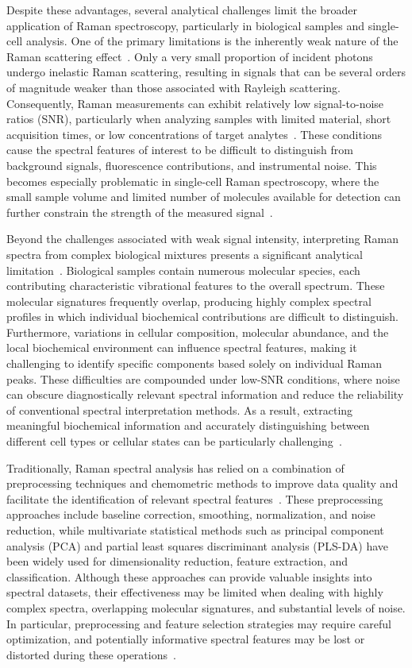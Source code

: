 \documentclass[journal,onecolumn]{IEEEtran}
\begin{document}
Despite these advantages, several analytical challenges limit the broader
application of Raman spectroscopy, particularly in biological samples and
single-cell analysis. One of the primary limitations is the inherently weak
nature of the Raman scattering effect~\cite{yi2025surface}. Only a very small
proportion of incident photons undergo inelastic Raman scattering, resulting
in signals that can be several orders of magnitude weaker than those associated
with Rayleigh scattering. Consequently, Raman measurements can exhibit
relatively low signal-to-noise ratios (SNR), particularly when analyzing
samples with limited material, short acquisition times, or low concentrations
of target analytes~\cite{yi2025surface}. These conditions cause the spectral
features of interest to be difficult to distinguish from background signals,
fluorescence contributions, and instrumental noise. This becomes especially
problematic in single-cell Raman spectroscopy, where the small sample volume
and limited number of molecules available for detection can further constrain
the strength of the measured signal~\cite{zhang2024genotype}.

Beyond the challenges associated with weak signal intensity, interpreting
Raman spectra from complex biological mixtures presents a significant
analytical limitation~\cite{yi2025surface}. Biological samples contain
numerous molecular species, each contributing characteristic vibrational
features to the overall spectrum. These molecular signatures frequently
overlap, producing highly complex spectral profiles in which individual
biochemical contributions are difficult to distinguish. Furthermore,
variations in cellular composition, molecular abundance, and the local
biochemical environment can influence spectral features, making it
challenging to identify specific components based solely on individual Raman
peaks. These difficulties are compounded under low-SNR conditions, where noise
can obscure diagnostically relevant spectral information and reduce the
reliability of conventional spectral interpretation methods. As a result,
extracting meaningful biochemical information and accurately distinguishing
between different cell types or cellular states can be particularly
challenging~\cite{zhang2024genotype}.

Traditionally, Raman spectral analysis has relied on a combination of
preprocessing techniques and chemometric methods to improve data quality and
facilitate the identification of relevant spectral
features~\cite{lussier2020deep,pan2021review}. These preprocessing approaches include baseline
correction, smoothing, normalization, and noise reduction, while multivariate
statistical methods such as principal component analysis (PCA) and partial
least squares discriminant analysis (PLS-DA) have been widely used for
dimensionality reduction, feature extraction, and classification. Although
these approaches can provide valuable insights into spectral datasets, their
effectiveness may be limited when dealing with highly complex spectra,
overlapping molecular signatures, and substantial levels of noise. In
particular, preprocessing and feature selection strategies may require careful
optimization, and potentially informative spectral features may be lost or
distorted during these operations~\cite{zhang2024genotype}.
\end{document}
